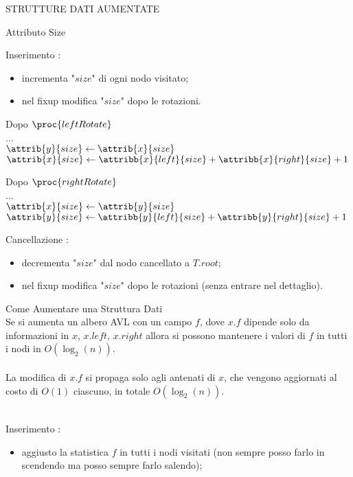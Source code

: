\documentclass[8pt]{extarticle}
\begin{document}
\begin{formulario}
\begin{myParagraph}{STRUTTURE DATI AUMENTATE}
\begin{subParagraph}{Attributo Size}
			\begin{descr}{1}
				\item[Inserimento]:\\
				\begin{itemize} 
					\item incrementa "$size$" di ogni nodo visitato;
					\item nel fixup modifica "$size$" dopo le rotazioni.
				\end{itemize}
Dopo $\proc{leftRotate}$\\
...\\
$\attrib{y}{size} \get \attrib{x}{size}$\\
$\attrib{x}{size} \get \attribb{x}{left}{size}+\attribb{x}{right}{size}+1$
	
Dopo $\proc{rightRotate}$\\
...\\
$\attrib{x}{size} \get \attrib{y}{size}$\\
$\attrib{y}{size} \get \attribb{y}{left}{size}+\attribb{y}{right}{size}+1$			
				\item[Cancellazione] :\\
				\begin{itemize} 
					\item decrementa "$size$" dal nodo cancellato a $T.root$;
					\item nel fixup modifica "$size$" dopo le rotazioni (senza entrare nel dettaglio).
				\end{itemize}
			\end{descr}
		\end{subParagraph}
		\begin{subParagraph}{Come Aumentare una Struttura Dati}
\\
Se si aumenta un albero AVL con un campo $f$, dove $x.f$ dipende solo da informazioni in $x$, $x.left$, $x.right$ allora si possono mantenere i valori di $f$ in tutti i nodi in $O(\log_2(n))$.\\
\\
La modifica di $x.f$ si propaga solo agli antenati di $x$, che vengono aggiornati al costo di $O(1)$ ciascuno, in totale $O(\log_2(n))$.\\
\\
			\begin{descr}{1}
				\item[Inserimento]:\\
				\begin{itemize} 
					\item aggiusto la statistica $f$ in tutti i nodi visitati (non sempre posso farlo in scendendo ma posso sempre farlo salendo);

\end{itemize}
\end{descr}
\end{subParagraph}
\end{myParagraph}
\end{formulario}
\end{document}
